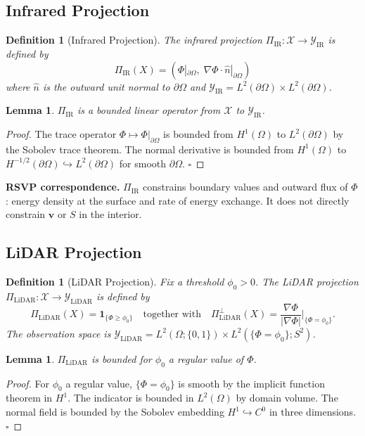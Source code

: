 \documentclass[11pt, oneside]{article}
\newtheorem{lemma}[theorem]{Lemma}
\newtheorem{definition}[theorem]{Definition}
\begin{document}
\subsection{Infrared Projection}

\begin{definition}[Infrared Projection]
The infrared projection $\Pi_{\mathrm{IR}} : \mathcal{X} \to \mathcal{Y}_{\mathrm{IR}}$
is defined by
\[
\Pi_{\mathrm{IR}}(X) = \left( \Phi|_{\partial\Omega},\;
\nabla\Phi \cdot \hat{n}|_{\partial\Omega} \right)
\]
where $\hat{n}$ is the outward unit normal to $\partial\Omega$ and
$\mathcal{Y}_{\mathrm{IR}} = L^2(\partial\Omega) \times L^2(\partial\Omega)$.
\end{definition}

\begin{lemma}
$\Pi_{\mathrm{IR}}$ is a bounded linear operator from $\mathcal{X}$ to $\mathcal{Y}_{\mathrm{IR}}$.
\end{lemma}
\begin{proof}
The trace operator $\Phi \mapsto \Phi|_{\partial\Omega}$ is bounded from $H^1(\Omega)$
to $L^2(\partial\Omega)$ by the Sobolev trace theorem. The normal derivative is bounded
from $H^1(\Omega)$ to $H^{-1/2}(\partial\Omega) \hookrightarrow L^2(\partial\Omega)$ for
smooth $\partial\Omega$. $\square$
\end{proof}

\textbf{RSVP correspondence.} $\Pi_{\mathrm{IR}}$ constrains boundary values and outward
flux of $\Phi$: energy density at the surface and rate of energy exchange. It does not
directly constrain $\mathbf{v}$ or $S$ in the interior.

\subsection{LiDAR Projection}

\begin{definition}[LiDAR Projection]
Fix a threshold $\phi_0 > 0$. The LiDAR projection
$\Pi_{\mathrm{LiDAR}} : \mathcal{X} \to \mathcal{Y}_{\mathrm{LiDAR}}$ is defined by
\[
\Pi_{\mathrm{LiDAR}}(X) = \mathbf{1}_{\{\Phi \ge \phi_0\}}
\quad \text{together with} \quad
\Pi_{\mathrm{LiDAR}}^{\perp}(X) =
\frac{\nabla\Phi}{|\nabla\Phi|}\bigg|_{\{\Phi = \phi_0\}}.
\]
The observation space is
$\mathcal{Y}_{\mathrm{LiDAR}} = L^2(\Omega;\{0,1\}) \times L^2(\{\Phi=\phi_0\};S^2)$.
\end{definition}

\begin{lemma}
$\Pi_{\mathrm{LiDAR}}$ is bounded for $\phi_0$ a regular value of $\Phi$.
\end{lemma}
\begin{proof}
For $\phi_0$ a regular value, $\{\Phi = \phi_0\}$ is smooth by the implicit function
theorem in $H^1$. The indicator is bounded in $L^2(\Omega)$ by domain volume. The normal
field is bounded by the Sobolev embedding $H^1 \hookrightarrow C^0$ in three dimensions.
$\square$
\end{proof}
\end{document}
